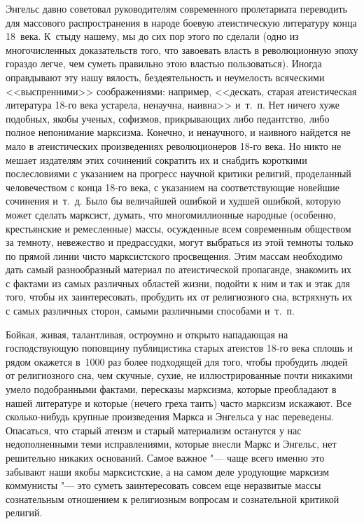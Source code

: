 Энгельс давно советовал руководителям современного пролетариата переводить
для массового распространения в народе боевую атеистическую литературу
конца 18~века. К~стыду нашему, мы до сих пор этого по сделали (одно из
многочисленных доказательств того, что завоевать власть в революционную
эпоху гораздо легче, чем суметь правильно этою властью пользоваться).
Иногда оправдывают эту нашу вялость, бездеятельность и неумелость
всяческими <<выспренними>> соображениями: например, <<дескать, старая
атеистическая литература 18-го века устарела, ненаучна, наивна>> и~т.~п. Нет
ничего хуже подобных, якобы ученых, софизмов, прикрывающих либо педантство,
либо полное непонимание марксизма. Конечно, и ненаучного, и наивного
найдется не мало в атеистических произведениях революционеров 18-го века.
Но никто не мешает издателям этих сочинений сократить их и снабдить
короткими послесловиями с указанием на прогресс научной критики религий,
проделанный человечеством с конца 18-го века, с указанием на
соответствующие новейшие сочинения и~т.~д. Было бы величайшей ошибкой и
худшей ошибкой, которую может сделать марксист, думать, что многомиллионные
народные (особенно, крестьянские и ремесленные) массы, осужденные всем
современным обществом за темноту, невежество и предрассудки, могут
выбраться из этой темноты только по прямой линии чисто марксистского
просвещения. Этим массам необходимо дать самый разнообразный материал по
атеистической пропаганде, знакомить их с фактами из самых различных
областей жизни, подойти к ним и так и этак для того, чтобы их
заинтересовать, пробудить их от религиозного сна, встряхнуть их с самых
различных сторон, самыми различными способами и~т.~п.

Бойкая, живая, талантливая, остроумно и открыто нападающая на господствующую
поповщину публицистика старых атеистов 18-го века сплошь и рядом окажется
в~1000 раз более подходящей для того, чтобы пробудить людей от религиозного
сна, чем скучные, сухие, не иллюстрированные почти никакими умело
подобранными фактами, пересказы марксизма, которые преобладают в нашей
литературе и которые (нечего греха таить) часто марксизм искажают. Все
сколько-нибудь крупные произведения Маркса и Энгельса у нас переведены.
Опасаться, что старый атеизм и старый материализм останутся у нас
недополненными теми исправлениями, которые внесли Маркс и Энгельс, нет
решительно никаких оснований. Самое важное "--- чаще всего именно это забывают
наши якобы марксистские, а на самом деле уродующие марксизм коммунисты
"--- это суметь заинтересовать совсем еще неразвитые массы сознательным
отношением к религиозным вопросам и сознательной критикой религий.

